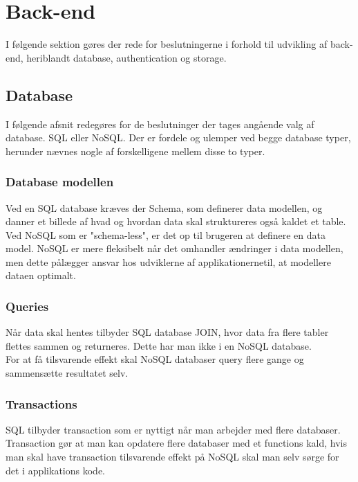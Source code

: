 \section{Back-end}
I følgende sektion gøres der rede for beslutningerne i forhold til udvikling af back-end, heriblandt database, authentication og storage.

\subsection{Database}
I følgende afsnit redegøres for de beslutninger der tages angående valg af database. SQL eller NoSQL.
Der er fordele og ulemper ved begge database typer, herunder nævnes nogle af forskelligene mellem disse to typer.

\subsubsection{Database modellen}

Ved en SQL database kræves der Schema, som definerer data modellen, og danner et billede af hvad og hvordan data skal struktureres også kaldet et table. Ved NoSQL som er "schema-less", er det op til brugeren at definere en data model. NoSQL er mere fleksibelt når det omhandler ændringer i data modellen, men dette pålægger ansvar hos udviklerne af applikationernetil, at modellere dataen optimalt.

\subsubsection{Queries\cite{Query}}
Når data skal hentes tilbyder SQL database JOIN\cite{JOIN}, hvor data fra flere tabler flettes sammen og returneres. Dette har man ikke i en NoSQL database. \\
For at få tilsvarende effekt skal NoSQL databaser query flere gange og sammensætte resultatet selv.

\subsubsection{Transactions\cite{Transactions}}
 SQL tilbyder transaction som er nyttigt når man arbejder med flere databaser. Transaction gør at man kan opdatere flere databaser med et functions kald, hvis man skal have transaction tilsvarende effekt på NoSQL skal man selv sørge for det i applikations kode. 

